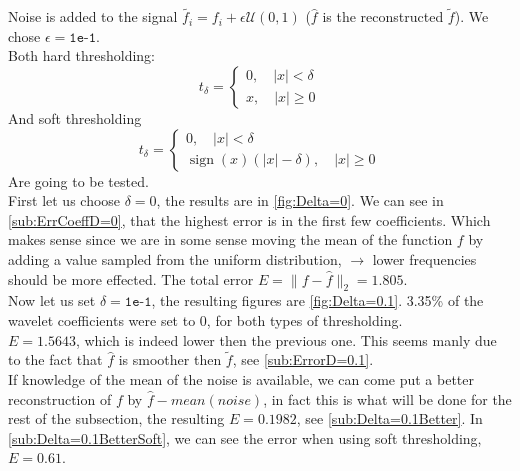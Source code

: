 \documentclass[a4paper]{article}
\DeclareMathOperator*{\sign}{sign}
\begin{document}
	Noise is added to the signal $\tilde{f_i} = f_i + \epsilon \mathcal{U}(0,1)$ ($\hat{f}$ is the reconstructed $\tilde{f}$). We chose $\epsilon = \texttt{1e-1}$. \\
	Both hard thresholding:
	\begin{equation*}
			t_\delta = \begin{cases}
				0, \quad |x| < \delta\\
				x, \quad |x| \ge 0
		\end{cases}
	\end{equation*}
	And soft thresholding
	\begin{equation*}
			t_\delta = \begin{cases}
			0, \quad |x| < \delta\\
			\sign{(x)} (|x|-\delta), \quad |x| \ge 0
	\end{cases}
	\end{equation*}
	Are going to be tested. \\
	First let us choose $\delta = 0$, the results are in \cref{fig:Delta=0}. We can see in \cref{sub:ErrCoeffD=0}, that the highest error is in the first few coefficients. Which makes sense since we are in some sense moving the mean of the function $f$ by adding a value sampled from the uniform distribution, $\rightarrow$ lower frequencies should be more effected. The total error $E = \|f-\hat{f}\|_2 = 1.805$.\\
	
	Now let us set $\delta = \texttt{1e-1}$, the resulting figures are \cref{fig:Delta=0.1}. 3.35\% of the wavelet coefficients were set to 0, for both types of thresholding. \\
	$E = 1.5643$, which is indeed lower then the previous one. This seems manly due to the fact that $\hat{f}$ is smoother then $\tilde{f}$, see \cref{sub:ErrorD=0.1}. \\
	If knowledge of the mean of the noise is available, we can come put a better reconstruction of $f$ by $\hat{f}-mean(noise)$, in fact this is what will be done for the rest of the subsection, the resulting $E = 0.1982$, see \cref{sub:Delta=0.1Better}. In \cref{sub:Delta=0.1BetterSoft}, we can see the error when using soft thresholding, $E = 0.61$.
\end{document}
